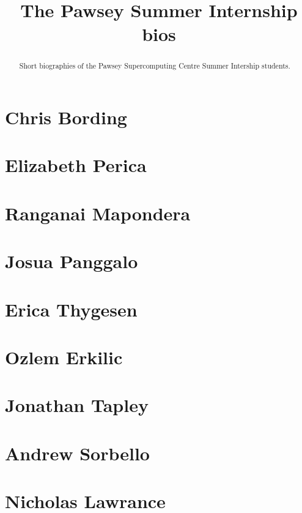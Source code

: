 \documentclass[11pt,a4paper]{report}
\title{The Pawsey Summer Internship bios}
\begin{document}
\maketitle
\tableofcontents


\begin{abstract}

Short biographies of the Pawsey Supercomputing Centre Summer Intership students.

\end{abstract}

\chapter{Chris Bording}


\chapter{Elizabeth Perica}


\chapter{Ranganai Mapondera}


\chapter{Josua Panggalo}


\chapter{Erica Thygesen}



\chapter{Ozlem Erkilic}


\chapter{Jonathan Tapley}


\chapter{Andrew Sorbello}


\chapter{Nicholas Lawrance}

\end{document}
